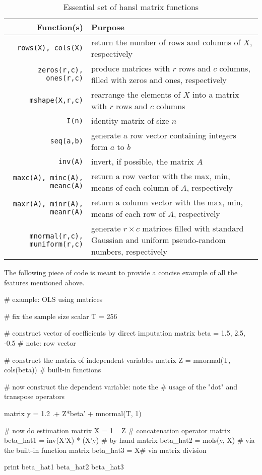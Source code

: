 \begin{table}[htbp]
  \centering
  \begin{tabular}{rp{}}
    \textbf{Function(s)} & \textbf{Purpose} \\
    \hline
    \texttt{rows(X), cols(X)} & return the number of rows and columns
    of $X$, respectively \\
    \texttt{zeros(r,c), ones(r,c)} & produce matrices with $r$ rows
    and $c$ columns, filled with zeros and ones, respectively \\
    \texttt{mshape(X,r,c)} & rearrange the elements of $X$ into a
    matrix with $r$ rows and $c$ columns \\
    \texttt{I(n)} & identity matrix of size $n$ \\
    \texttt{seq(a,b)} & generate a row vector containing integers form
    $a$ to $b$ \\
    \texttt{inv(A)} & invert, if possible, the matrix $A$ \\
    \texttt{maxc(A), minc(A), meanc(A)} & return a row vector
    with the max, min, means of each column of $A$, respectively\\
    \texttt{maxr(A), minr(A), meanr(A)} & return a column vector
    with the max, min, means of each row of $A$, respectively\\
    \texttt{mnormal(r,c), muniform(r,c)} & generate $r \times c$
    matrices filled with standard Gaussian and uniform pseudo-random
    numbers, respectively \\
    \hline
  \end{tabular}
  \caption{Essential set of hansl matrix functions}
  \label{tab:essential-matfuncs}
\end{table}

The following piece of code is meant to provide a concise example of
all the features mentioned above.

\begin{code}
# example: OLS using matrices

# fix the sample size
scalar T = 256

# construct vector of coefficients by direct imputation
matrix beta = {1.5, 2.5, -0.5} # note: row vector

# construct the matrix of independent variables
matrix Z = mnormal(T, cols(beta)) # built-in functions

# now construct the dependent variable: note the
# usage of the "dot" and transpose operators

matrix y = {1.2} .+ Z*beta' + mnormal(T, 1)

# now do estimation
matrix X = 1 ~ Z  # concatenation operator
matrix beta_hat1 = inv(X'X) * (X'y) # by hand
matrix beta_hat2 = mols(y, X)       # via the built-in function
matrix beta_hat3 = X\y              # via matrix division

print beta_hat1 beta_hat2 beta_hat3
\end{code}

